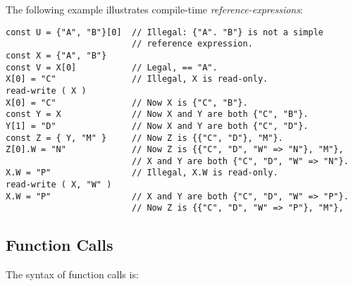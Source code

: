 \documentclass[12pt]{article}
\newenvironment{indpar}[1][0.3in]%
	{\begin{list}{}%
		     {\setlength{\itemsep}{0in}%
		      \setlength{\topsep}{0in}%
		      \setlength{\parsep}{1ex}%
		      \setlength{\labelwidth}{#1}%
		      \setlength{\leftmargin}{#1}%
		      \addtolength{\leftmargin}{\labelsep}}%
	 \item}%
	{\end{list}}
\begin{document}
The following example illustrates compile-time {\em reference-expressions}:
\begin{indpar}\begin{verbatim}
const U = {"A", "B"}[0]  // Illegal: {"A". "B"} is not a simple
                         // reference expression.
const X = {"A", "B"}
const V = X[0]           // Legal, == "A".
X[0] = "C"               // Illegal, X is read-only.
read-write ( X )
X[0] = "C"               // Now X is {"C", "B"}.
const Y = X              // Now X and Y are both {"C", "B"}.
Y[1] = "D"               // Now X and Y are both {"C", "D"}.
const Z = { Y, "M" }     // Now Z is {{"C", "D"}, "M"}.
Z[0].W = "N"             // Now Z is {{"C", "D", "W" => "N"}, "M"},
                         // X and Y are both {"C", "D", "W" => "N"}.
X.W = "P"                // Illegal, X.W is read-only.
read-write ( X, "W" )
X.W = "P"                // X and Y are both {"C", "D", "W" => "P"}.
                         // Now Z is {{"C", "D", "W" => "P"}, "M"},
\end{verbatim}\end{indpar}

\subsection{Function Calls}
\label{FUNCTION-CALLS}

The syntax of function calls is:
\end{document}
